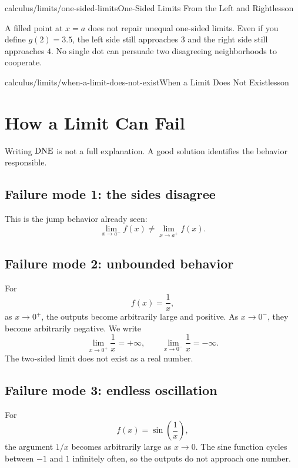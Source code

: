 \begin{webpage}{calculus/limits/one-sided-limits}{One-Sided Limits From the Left and Right}{lesson}
\begin{bgexamnote}
A filled point at \(x=a\) does not repair unequal one-sided limits. Even if you define \(g(2)=3.5\), the left side still approaches \(3\) and the right side still approaches \(4\). No single dot can persuade two disagreeing neighborhoods to cooperate.
\end{bgexamnote}
\end{webpage}

\begin{webpage}{calculus/limits/when-a-limit-does-not-exist}{When a Limit Does Not Exist}{lesson}
\section{How a Limit Can Fail}


Writing \(\mathrm{DNE}\) is not a full explanation. A good solution identifies the behavior responsible.

\subsection{Failure mode 1: the sides disagree}

This is the jump behavior already seen:
\[
  \lim_{x\to a^-}f(x)\ne\lim_{x\to a^+}f(x).
\]

\subsection{Failure mode 2: unbounded behavior}

For
\[
  f(x)=\frac1x,
\]
as \(x\to0^+\), the outputs become arbitrarily large and positive. As \(x\to0^-\), they become arbitrarily negative. We write
\[
  \lim_{x\to0^+}\frac1x=+\infty,
  \qquad
  \lim_{x\to0^-}\frac1x=-\infty.
\]
The two-sided limit does not exist as a real number.

\subsection{Failure mode 3: endless oscillation}

For
\[
  f(x)=\sin\left(\frac1x\right),
\]
the argument \(1/x\) becomes arbitrarily large as \(x\to0\). The sine function cycles between \(-1\) and \(1\) infinitely often, so the outputs do not approach one number.


\end{webpage}
